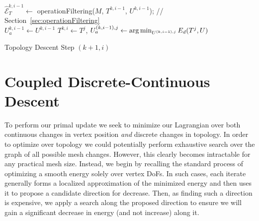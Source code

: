 
\begin{algorithm}[h]
\SetAlgoLined
{}
$\hat{\mathcal{E}}^{k,i-1}_T \leftarrow$ operationFiltering($M$, $T^{k,i-1}$, $U^{k,i-1}$); // Section~\ref{sec:operationFiltering}\\
$U_a^{k,i-1} \leftarrow U^{k,i-1}$\;
{
  $T^{k,i} \leftarrow T^j$, $U_a^{(k,i-1),j} \leftarrow \operatorname*{arg\,min}_{U^{(k,i-1),j}} E_d(T^j,U)$\;
}
\caption{Topology Descent Step $(k+1,i)$}
\label{alg:topologyStep}
\end{algorithm}

\section{Coupled Discrete-Continuous Descent}
\label{sec:topologySearch}
To perform our primal update we seek to minimize our Lagrangian
over both continuous changes in vertex position \emph{and} discrete changes in topology. 
%
In order to optimize over topology we could potentially perform exhaustive search over the graph of all possible mesh changes. However, this clearly becomes intractable for any practical mesh size. 
Instead, we begin by recalling the standard process of optimizing a smooth energy solely over vertex DoFs. In such cases, each iterate generally forms a localized approximation of the minimized energy and then uses it to propose a candidate direction for decrease. Then, as finding such a direction is expensive, we apply a search along the proposed direction to ensure we will gain a significant decrease in energy (and not increase) along it. 

